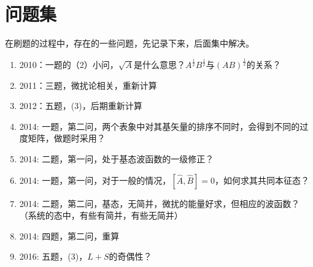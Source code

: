\chapter*{问题集}
在刷题的过程中，存在的一些问题，先记录下来，后面集中解决。
\begin{enumerate}
	\renewcommand{\labelenumi}{\arabic{enumi}.}
	\item
	2010：一题的（2）小问，$ \sqrt{A} $是什么意思？$ A^{ \frac{1}{2} }B^{ \frac{1}{2} } $与$ (AB)^{ \frac{1}{2} } $的关系？
	\item 
	2011：三题，微扰论相关，重新计算
	\item 
	2012：五题，(3)，后期重新计算
	\item 
	2014: 一题，第二问，两个表象中对其基矢量的排序不同时，会得到不同的过度矩阵，做题时采用？
	\item 
	2014: 二题，第一问，处于基态波函数的一级修正？
	\item 
	2014: 一题，第一问，对于一般的情况，$ [\hat{A},\hat{B}]=0 $，如何求其共同本征态？
	\item 
	2014: 二题，第二问，基态，无简并，微扰的能量好求，但相应的波函数？（系统的态中，有些有简并，有些无简并）
	\item 
	2014: 四题，第二问，重算
	\item 
	2016: 五题，(3)，$ L+S $的奇偶性？
\end{enumerate}



